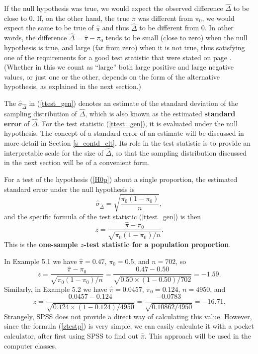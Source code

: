 If the null hypothesis was true, we would expect the observed difference
$\hat{\Delta}$ to be close to 0. If, on the other hand, the true
$\pi$ was different from $\pi_{0}$, we would expect the same to be true
of $\hat{\pi}$ and thus $\hat{\Delta}$ to be different from 0. In other
words, the difference $\hat{\Delta}=\hat{\pi}-\pi_{0}$ tends to be small
(close to zero) when the null hypothesis is true, and large (far from
zero) when it is not true, thus satisfying one of the requirements for a
good test statistic that were stated on page \pageref{p_2reqs}. (Whether
in this we count as ``large'' both large positive and large negative
values, or just one or the other, depends on the form of the alternative
hypothesis, as explained in the next section.)

The $\hat{\sigma}_{\hat{\Delta}}$ in (\ref{ttest_gen}) denotes an
estimate of the standard deviation of the sampling distribution of
$\hat{\Delta}$, which is also known as the estimated \textbf{standard
error} of $\hat{\Delta}$. For the test statistic (\ref{ttest_gen}), it
is evaluated under the null hypothesis. The concept of a standard error
of an estimate will be discussed in more detail in Section
\ref{s_contd_clt}. Its role in the test statistic is to provide an
interpretable scale for the size  of $\hat{\Delta}$, so that
the sampling distribution discussed in the next section will be of
a convenient form.

For a test of the hypothesis (\ref{H0p}) about a single proportion,
the estimated standard error under the
null hypothesis is
\begin{equation}
\hat{\sigma}_{\hat{\Delta}} = \sqrt{\frac{\pi_{0}(1-\pi_{0})}{n}},
\label{seDhatp}
\end{equation}
and the specific formula of the test statistic (\ref{ttest_gen})
is then
\begin{equation}
z=\frac{\hat{\pi}-\pi_{0}}
{\sqrt{\pi_{0}(1-\pi_{0})/n}}.
\label{ztestp}
\end{equation}
This is the \textbf{one-sample
$z$-test statistic for a population proportion}.

In Example 5.1 we have $\hat{\pi}=0.47$, $\pi_{0}=0.5$, and $n=702$, so
\[
z=\frac{\hat{\pi}-\pi_{0}}{\sqrt{\pi_{0}(1-\pi_{0})/n}}=
\frac{0.47-0.50}{\sqrt{0.50\times(1-0.50)/702}}=-1.59.
\]
Similarly, in Example 5.2 we have $\hat{\pi}=0.0457$, $\pi_{0}=0.124$,
$n=4950$,
and
\[
z=\frac{0.0457-0.124}{\sqrt{0.124\times(1-0.124)/4950}}
=
\frac{-0.0783}{\sqrt{0.10862/4950}}=-16.71.
\]
Strangely, SPSS does not provide a direct way of calculating this value.
However, since the formula (\ref{ztestp}) is very simple, we can easily
calculate it with a pocket calculator, after first using SPSS to find
out $\hat{\pi}$. This approach will be used in the computer classes.

